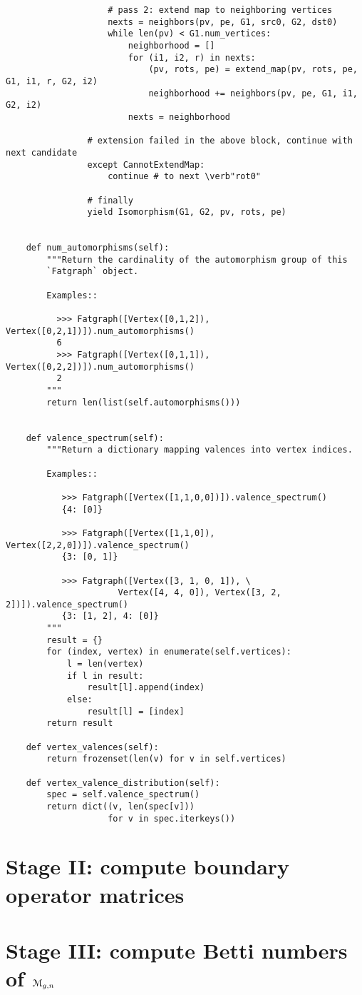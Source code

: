 \begin{lstlisting}
                    # pass 2: extend map to neighboring vertices
                    nexts = neighbors(pv, pe, G1, src0, G2, dst0)
                    while len(pv) < G1.num_vertices:
                        neighborhood = []
                        for (i1, i2, r) in nexts:
                            (pv, rots, pe) = extend_map(pv, rots, pe, G1, i1, r, G2, i2)
                            neighborhood += neighbors(pv, pe, G1, i1, G2, i2)
                        nexts = neighborhood

                # extension failed in the above block, continue with next candidate
                except CannotExtendMap:
                    continue # to next \verb"rot0"

                # finally
                yield Isomorphism(G1, G2, pv, rots, pe)


    def num_automorphisms(self):
        """Return the cardinality of the automorphism group of this
        `Fatgraph` object.

        Examples::

          >>> Fatgraph([Vertex([0,1,2]), Vertex([0,2,1])]).num_automorphisms()
          6
          >>> Fatgraph([Vertex([0,1,1]), Vertex([0,2,2])]).num_automorphisms()
          2
        """
        return len(list(self.automorphisms()))
    

    def valence_spectrum(self):
        """Return a dictionary mapping valences into vertex indices.

        Examples::

           >>> Fatgraph([Vertex([1,1,0,0])]).valence_spectrum()
           {4: [0]}

           >>> Fatgraph([Vertex([1,1,0]), Vertex([2,2,0])]).valence_spectrum()
           {3: [0, 1]}

           >>> Fatgraph([Vertex([3, 1, 0, 1]), \
                      Vertex([4, 4, 0]), Vertex([3, 2, 2])]).valence_spectrum()
           {3: [1, 2], 4: [0]}
        """
        result = {}
        for (index, vertex) in enumerate(self.vertices):
            l = len(vertex)
            if l in result:
                result[l].append(index)
            else:
                result[l] = [index]
        return result

    def vertex_valences(self):
        return frozenset(len(v) for v in self.vertices)

    def vertex_valence_distribution(self):
        spec = self.valence_spectrum()
        return dict((v, len(spec[v]))
                    for v in spec.iterkeys())
\end{lstlisting}


\section[Stage II]{Stage II: compute boundary operator matrices}
\label{sec:stage-ii}

\section[Stage III]{Stage III: compute Betti numbers of $\mathcal{M}_{g,n}$}
\label{sec:stage-iii}



